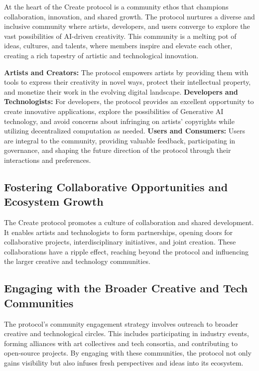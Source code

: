 \documentclass[12pt,a4paper]{article}
\begin{document}
At the heart of the Create protocol is a community ethos that champions collaboration, innovation, and shared growth. The protocol nurtures a diverse and inclusive community where artists, developers, and users converge to explore the vast possibilities of AI-driven creativity. This community is a melting pot of ideas, cultures, and talents, where members inspire and elevate each other, creating a rich tapestry of artistic and technological innovation.

\textbf{Artists and Creators:} The protocol empowers artists by providing them with tools to express their creativity in novel ways, protect their intellectual property, and monetize their work in the evolving digital landscape.
\textbf{Developers and Technologists:} For developers, the protocol provides an excellent opportunity to create innovative applications, explore the possibilities of Generative AI technology, and avoid concerns about infringing on artists' copyrights while utilizing decentralized computation as needed.
\textbf{Users and Consumers:} Users are integral to the community, providing valuable feedback, participating in governance, and shaping the future direction of the protocol through their interactions and preferences.

\subsection{Fostering Collaborative Opportunities and Ecosystem Growth}

The Create protocol promotes a culture of collaboration and shared development. It enables artists and technologists to form partnerships, opening doors for collaborative projects, interdisciplinary initiatives, and joint creation. These collaborations have a ripple effect, reaching beyond the protocol and influencing the larger creative and technology communities.
\subsection{Engaging with the Broader Creative and Tech Communities}

The protocol's community engagement strategy involves outreach to broader creative and technological circles. This includes participating in industry events, forming alliances with art collectives and tech consortia, and contributing to open-source projects. By engaging with these communities, the protocol not only gains visibility but also infuses fresh perspectives and ideas into its ecosystem.
\end{document}
